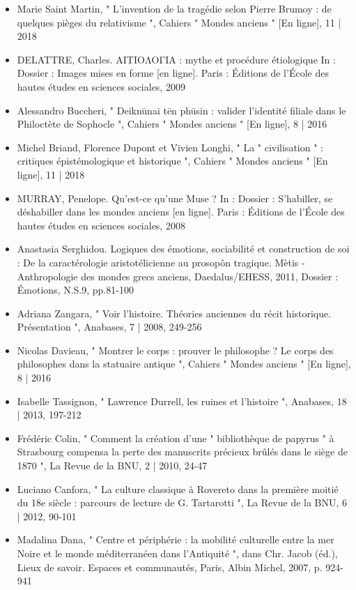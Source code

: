 \documentclass{article}
\begin{document}
\begin{itemize}
    \item Marie Saint Martin, " L’invention de la tragédie selon Pierre Brumoy : de quelques pièges du relativisme ", Cahiers " Mondes anciens " [En ligne], 11 | 2018
    \item DELATTRE, Charles. ΑΙΤΙΟΛΟΓΙΑ : mythe et procédure étiologique In : Dossier : Images mises en forme [en ligne]. Paris : Éditions de l’École des hautes études en sciences sociales, 2009
    \item Alessandro Buccheri, " Deiknūnai tēn phūsin : valider l’identité filiale dans le Philoctète de Sophocle ", Cahiers " Mondes anciens " [En ligne], 8 | 2016
    \item Michel Briand, Florence Dupont et Vivien Longhi, " La " civilisation " : critiques épistémologique et historique ", Cahiers " Mondes anciens " [En ligne], 11 | 2018
    \item MURRAY, Penelope. Qu’est-ce qu’une Muse ? In : Dossier : S'habiller, se déshabiller dans les mondes anciens [en ligne]. Paris : Éditions de l’École des hautes études en sciences sociales, 2008
    \item Anastasia Serghidou. Logiques des émotions, sociabilité et construction de soi : De la caractérologie aristotélicienne au prosopôn tragique. Mètis - Anthropologie des mondes grecs anciens, Daedalus/EHESS, 2011, Dossier : Émotions, N.S.9, pp.81-100
    \item Adriana Zangara, " Voir l’histoire. Théories anciennes du récit historique. Présentation ", Anabases, 7 | 2008, 249-256
    \item Nicolas Davieau, " Montrer le corps : prouver le philosophe ? Le corps des philosophes dans la statuaire antique ", Cahiers " Mondes anciens " [En ligne], 8 | 2016
    \item Isabelle Tassignon, " Lawrence Durrell, les ruines et l’histoire ", Anabases, 18 | 2013, 197-212
    \item Frédéric Colin, " Comment la création d’une " bibliothèque de papyrus " à Strasbourg compensa la perte des manuscrits précieux brûlés dans le siège de 1870 ", La Revue de la BNU, 2 | 2010, 24-47
    \item Luciano Canfora, " La culture classique à Rovereto dans la première moitié du 18e siècle : parcours de lecture de G. Tartarotti ", La Revue de la BNU, 6 | 2012, 90-101
    \item Madalina Dana, " Centre et périphérie : la mobilité culturelle entre la mer Noire et le monde méditerranéen dans l’Antiquité ", dans Chr. Jacob (éd.), Lieux de savoir. Espaces et communautés, Paris, Albin Michel, 2007, p. 924-941

\end{itemize}
\end{document}
